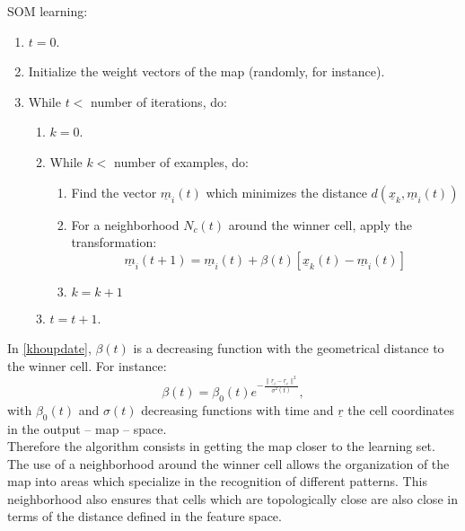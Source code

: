 \begin{algo}
SOM learning:
\begin{enumerate}
\item $t=0$.
\item Initialize the weight vectors of the map (randomly, for instance).
\item While $t<$ number of iterations, do:
\begin{enumerate}
\item $k=0$.
\item While $k<$ number of examples, do:
\begin{enumerate}
\item Find the vector $\underline{m}_i(t)$ which minimizes the distance
$d(\underline{x}_k,\underline{m}_i(t))$
\item For a neighborhood $N_c(t)$ around the winner cell, apply the transformation:
\begin{equation}
\underline{m}_i(t+1)=\underline{m}_i(t)+\beta(t)\left[\underline{x}_k(t)-\underline{m}_i(t)\right]
\label{khoupdate}
\end{equation}
\item $k=k+1$
\end{enumerate}
\item $t=t+1$.
\end{enumerate}

\end{enumerate}
\end{algo}


In \ref{khoupdate}, $\beta(t)$ is a decreasing function with the
geometrical distance to the winner cell. For instance:
\begin{equation}
\beta(t)=\beta_0(t)e^{-\frac{\parallel \underline{r}_i -  \underline{r}_c\parallel^2}{\sigma^2(t)}},
\end{equation}
with $\beta_0(t)$ and $\sigma(t)$ decreasing functions with time and
$\underline{r}$ the cell coordinates in the output -- map -- space.\\

Therefore the algorithm consists in getting the map closer to the
learning set. The use of a neighborhood around the winner cell allows
the organization of the map into areas which specialize in the
recognition of different patterns. This neighborhood also ensures that
cells which are topologically close are also close in terms of the
distance defined in the feature space.

